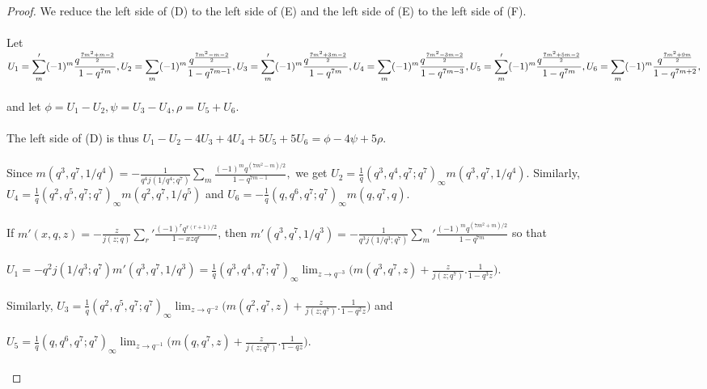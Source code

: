 \documentclass[10pt,reqno]{amsart}
\begin{document}
\begin{proof}
We reduce the left side of (D) to the left side of (E) and the left side of (E) to the left side of (F). \\ \\
Let $U_1=\displaystyle\sum_{m}'(-1)^m\displaystyle\frac{q^{\frac{7m^2+m-2}{2}}}{1-q^{7m}}, U_2=\displaystyle\sum_{m}(-1)^m\displaystyle\frac{q^{\frac{7m^2-m-2}{2}}}{1-q^{7m-1}}, U_3=\displaystyle\sum_{m}'(-1)^m\displaystyle\frac{q^{\frac{7m^2+3m-2}{2}}}{1-q^{7m}},\\ \\U_4=\displaystyle\sum_{m}(-1)^m\displaystyle\frac{q^{\frac{7m^2-3m-2}{2}}}{1-q^{7m-3}},U_5=\displaystyle\sum_{m}'(-1)^m\displaystyle\frac{q^{\frac{7m^2+5m-2}{2}}}{1-q^{7m}},U_6=\displaystyle\sum_{m}(-1)^m\displaystyle\frac{q^{\frac{7m^2+9m}{2}}}{1-q^{7m+2}},$ \\ \\ and let $\phi=U_1-U_2,\psi=U_3-U_4,\rho=U_5+U_6.$ \\ \\
The left side of (D) is thus $U_1-U_2-4U_3+4U_4+5U_5+5U_6=\phi-4\psi+5\rho.$ \\ \\
Since $m(q^3,q^7,1/q^4)=-\displaystyle\frac{1}{q^4j(1/q^4;q^7)}\displaystyle\sum_{m}\displaystyle\frac{(-1)^mq^{(7m^2-m)/2}}{1-q^{7m-1}},$ we get $U_2=\displaystyle\frac{1}{q}(q^3,q^4,q^7;q^7)_{\infty}m(q^3,q^7,1/q^4).$ Similarly, $U_4=\displaystyle\frac{1}{q}(q^2,q^5,q^7;q^7)_{\infty}m(q^2,q^7,1/q^5)$ and $U_6=-\displaystyle\frac{1}{q}(q,q^6,q^7;q^7)_{\infty}m(q,q^7,q).$ \\ \\
If $m'(x,q,z)=-\displaystyle\frac{z}{j(z;q)}\displaystyle\sum_{r}'\displaystyle\frac{(-1)^rq^{r(r+1)/2}}{1-xzq^r}$, then $m'(q^3,q^7,1/q^3)=-\displaystyle\frac{1}{q^3j(1/q^3;q^7)}\displaystyle\sum_{m}'\displaystyle\frac{(-1)^mq^{(7m^2+m)/2}}{1-q^{7m}}$ so that \\ \\ $U_1=-q^2j(1/q^3;q^7)m'(q^3,q^7,1/q^3)=\displaystyle\frac{1}{q}(q^3,q^4,q^7;q^7)_{\infty}\lim_{z\to q^{-3}}\Bigg(m(q^3,q^7,z)+\displaystyle\frac{z}{j(z;q^7)}.\displaystyle\frac{1}{1-q^3z}\Bigg).$ \\ \\
Similarly, $U_3=\displaystyle\frac{1}{q}(q^2,q^5,q^7;q^7)_{\infty}\lim_{z\to q^{-2}}\Bigg(m(q^2,q^7,z)+\displaystyle\frac{z}{j(z;q^7)}.\displaystyle\frac{1}{1-q^2z}\Bigg)$ and \\ \\
$U_5=\displaystyle\frac{1}{q}(q,q^6,q^7;q^7)_{\infty}\lim_{z\to q^{-1}}\Bigg(m(q,q^7,z)+\displaystyle\frac{z}{j(z;q^7)}.\displaystyle\frac{1}{1-qz}\Bigg).$ \\ \\

\end{proof}
\end{document}
